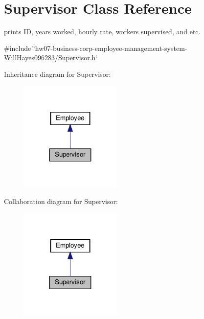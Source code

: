 \hypertarget{classSupervisor}{}\section{Supervisor Class Reference}
\label{classSupervisor}


prints ID, years worked, hourly rate, workers supervised, and etc.  




{\ttfamily \#include \char`\"{}hw07-\/business-\/corp-\/employee-\/management-\/system-\/\+Will\+Hayes096283/\+Supervisor.\+h\char`\"{}}



Inheritance diagram for Supervisor\+:\nopagebreak
\begin{figure}[H]
\begin{center}
\leavevmode
\includegraphics[width=143pt]{classSupervisor__inherit__graph}
\end{center}
\end{figure}


Collaboration diagram for Supervisor\+:\nopagebreak
\begin{figure}[H]
\begin{center}
\leavevmode
\includegraphics[width=143pt]{classSupervisor__coll__graph}
\end{center}
\end{figure}
